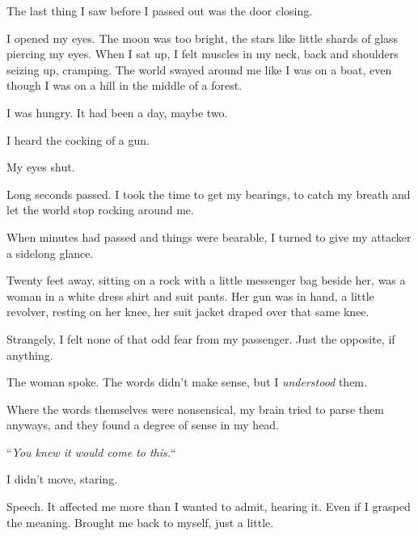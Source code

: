 The last thing I saw before I passed out was the door closing.



\blacksquare



I opened my eyes.  The moon was too bright, the stars like little shards of glass piercing my eyes.  When I sat up, I felt muscles in my neck, back and shoulders seizing up, cramping.  The world swayed around me like I was on a boat, even though I was on a hill in the middle of a forest.



I was hungry.  It had been a day, maybe two.



I heard the cocking of a gun.



My eyes shut.



Long seconds passed.  I took the time to get my bearings, to catch my breath and let the world stop rocking around me.



When minutes had passed and things were bearable, I turned to give my attacker a sidelong glance.



Twenty feet away, sitting on a rock with a little messenger bag beside her, was a woman in a white dress shirt and suit pants.  Her gun was in hand, a little revolver, resting on her knee, her suit jacket draped over that same knee.



Strangely, I felt none of that odd fear from my passenger.  Just the opposite, if anything.



The woman spoke.  The words didn't make sense, but I \emph{understood} them\emph{.  }



Where the words themselves were nonsensical, my brain tried to parse them anyways, and they found a degree of sense in my head.



``\emph{You knew it would come to this.}``



I didn't move, staring.



Speech.  It affected me more than I wanted to admit, hearing it.  Even if I grasped the meaning.  Brought me back to myself, just a little.



